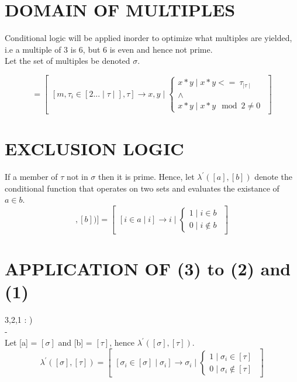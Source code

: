 \documentclass[11pt]{article}
\begin{document}
\section{DOMAIN OF MULTIPLES}
Conditional logic will be applied inorder to optimize what multiples are yielded, i.e a multiple of 3 is 6, but 6 is even and hence not
prime.\\
Let the set of multiples be denoted $\sigma$.

\begin{equation}
	[\sigma]=\begin{bmatrix} [m,\tau_i \in [2...\mid\tau\mid],\tau]\rightarrow x,y \mid
	\begin{cases}x*y\mid x*y <= \ \tau_{\mid\tau\mid}\\ \land\\x*y\mid x*y \mod 2 \not = 0\end{cases}\end{bmatrix}
\end{equation}


\section{EXCLUSION LOGIC}
If a member of $\tau$ not in $\sigma$ then it is prime.
Hence, let $\lambda^\prime([a],[b])$ denote the conditional function that operates on two sets and evaluates the existance of $a\in b$.
\begin{equation}[\lambda^\prime([a],[b])] =\begin{bmatrix} [i \in a\mid i]\rightarrow i \mid\begin{cases}1 \mid i \in b\\ 0 \mid i 
\not\in b\end{cases}\end{bmatrix}\end{equation}

\section{APPLICATION OF (3) to (2) and (1)}
{\color{red}3,2,1 : )}\\
{\color{white}-}
\\
Let [a] = $[\sigma]$ and [b] = $[\tau]$, hence $\lambda^\prime([\sigma],[\tau])$.
\begin{equation} \lambda^\prime([\sigma],[\tau])= \begin{bmatrix}[\sigma_i\in[\sigma]\mid\sigma_i]\rightarrow\sigma_i\mid
	\begin{cases}1 \mid \sigma_i \in [\tau]\\ 0 \mid \sigma_i \not\in [\tau]\end{cases}\end{bmatrix} \end{equation}
\end{document}
